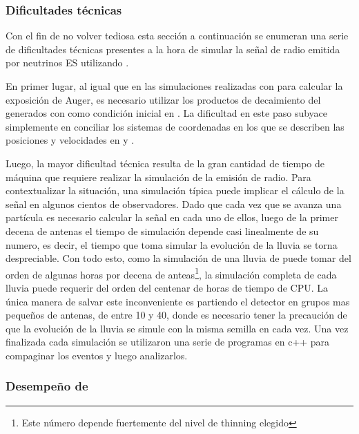 		
		\subsubsection{Dificultades técnicas}

		Con el fin de no volver tediosa esta sección a continuaci\'on se enumeran una serie de dificultades técnicas presentes a la hora de simular la señal de radio emitida por neutrinos ES utilizando \zhs{}.

		En primer lugar, al igual que en las simulaciones realizadas con \aires{} para calcular la exposici\'on de Auger, es necesario utilizar los productos de decaimiento del \tauon{} generados con \tauola{} como condici\'on inicial en \aires{}.
		La dificultad en este paso subyace simplemente en conciliar los sistemas de coordenadas en los que se describen las posiciones y velocidades en \tauola{} y \aires{}.

		Luego, la mayor dificultad técnica resulta de la gran cantidad de tiempo de máquina que requiere realizar la simulación de la emisión de radio.
		Para contextualizar la situación, una simulación típica puede implicar el c\'alculo de la señal en algunos cientos de observadores.
		Dado que cada vez que se avanza una partícula es necesario calcular la señal en cada uno de ellos, luego de la primer decena de antenas el tiempo de simulación depende casi linealmente de su numero, es decir, el tiempo que toma simular la evolución de la lluvia se torna despreciable.
		Con todo esto, como la simulación de una lluvia de  puede tomar del orden de algunas horas por decena de anteas\footnote{Este número depende fuertemente del nivel de thinning elegido}, la simulación completa de cada lluvia puede requerir del orden del centenar de horas de tiempo de CPU.
		La única manera de salvar este inconveniente es partiendo el detector en grupos mas pequeños de antenas, de entre 10 y 40, donde es necesario tener la precaución de que la evolución de la lluvia se simule con la misma semilla en cada vez.
		Una vez finalizada cada simulaci\'on se utilizaron una serie de programas en c++ para compaginar los eventos y luego analizarlos.
		
		\subsubsection{Desempe\~no de \zhs{}}
		
